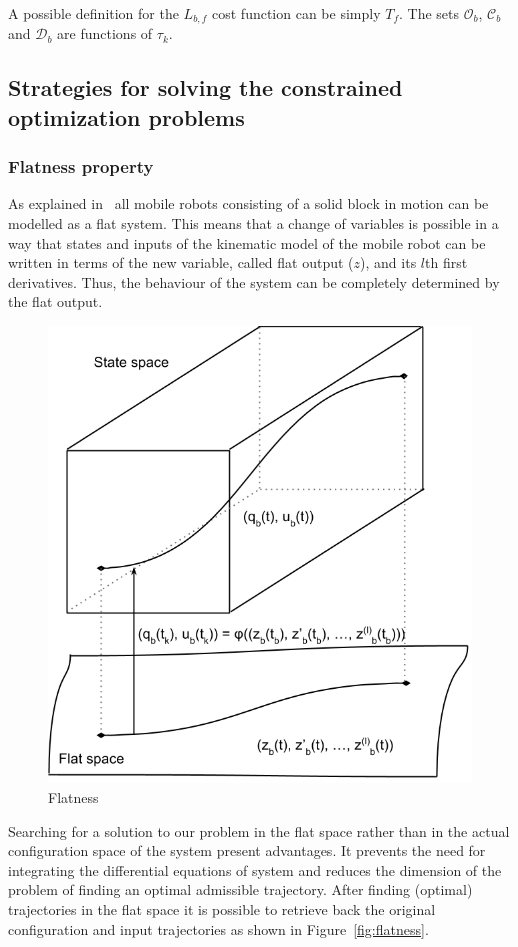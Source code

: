 \documentclass[eprint]{actapoly}
\begin{document}
A possible definition for the $L_{b,f}$ cost function can be simply $T_f$.
The sets $\mathcal{O}_b$, $\mathcal{C}_b$ and $\mathcal{D}_b$ are functions of
$\tau_k$.




\subsection{Strategies for solving the constrained optimization problems}



\subsubsection{Flatness property}

As explained in~\cite{Defoort2007a} all mobile robots consisting of a solid
block in motion can be modelled as a flat system. 
This means that a change of variables is possible in a way that states and
inputs of the kinematic model of the mobile robot can be written in terms
of the new variable, called flat output ($z$), and its $l$th first derivatives.
Thus, the behaviour of the system can be completely determined by the flat
output.

\begin{figure}[!h]\centering
  \includegraphics[width=.7\linewidth]{./images/flatness.png} %
  \caption{Flatness\label{fig:flatness}}
\label{fig:res}
\end{figure}

Searching for a solution to our problem in the flat space rather than in
the actual configuration space of the system present advantages.
It prevents the need for integrating the differential equations
of system and reduces the dimension of the problem of finding an optimal
admissible trajectory.
After finding (optimal) trajectories in the flat space it is possible
to retrieve back the original configuration and input trajectories as shown in
Figure~\ref{fig:flatness}.
\end{document}
